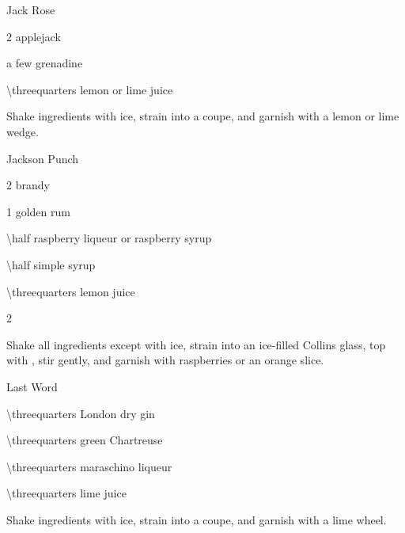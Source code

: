 \begin{Cocktail}{Jack Rose}
	\begin{Ingredients}
	\item \SI{2}{\oz} applejack
	\item a few \si{\dashes} grenadine
	\item \SI{\threequarters}{\oz} lemon or lime juice
	\end{Ingredients}
	
	\begin{Instructions}
	Shake ingredients with ice, strain into a coupe, and garnish with a lemon or lime wedge.
	\end{Instructions}
\end{Cocktail}

\begin{Cocktail}{Jackson Punch}
	\begin{Ingredients}
	\item \SI{2}{\oz} brandy
	\item \SI{1}{\oz} golden rum
	\item \SI{\half}{\oz} raspberry liqueur or raspberry syrup
	\item \SI{\half}{\oz} simple syrup
	\item \SI{\threequarters}{\oz} lemon juice
	\item \SI{2}{\oz} \soda\/
	\end{Ingredients}
	
	\begin{Instructions}
	Shake all ingredients except \soda\/ with ice, strain into an ice-filled Collins glass, top with \soda\/, stir gently, and garnish with raspberries or an orange slice.
	\end{Instructions}
\end{Cocktail}

\begin{Cocktail}{Last Word}
	\begin{Ingredients}
	\item \SI{\threequarters}{\oz} London dry gin
	\item \SI{\threequarters}{\oz} green Chartreuse
	\item \SI{\threequarters}{\oz} maraschino liqueur
	\item \SI{\threequarters}{\oz} lime juice
	\end{Ingredients}
	
	\begin{Instructions}
	Shake ingredients with ice, strain into a coupe, and garnish with a lime wheel.
	\end{Instructions}
\end{Cocktail}

